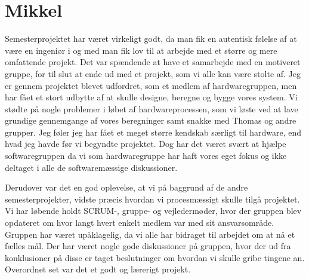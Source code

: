 \section{Mikkel}
Semesterprojektet har været virkeligt godt, da man fik en autentisk følelse af at være en ingeniør i og med man fik lov til at arbejde med et større og mere omfattende projekt. Det var spændende at have et samarbejde med en motiveret gruppe, for til slut at ende ud med et projekt, som vi alle kan være stolte af. Jeg er gennem projektet blevet udfordret, som et medlem af hardwaregruppen, men har fået et stort udbytte af at skulle designe, beregne og bygge vores system. Vi stødte på nogle problemer i løbet af hardwareprocessen, som vi løste ved at lave grundige gennemgange af vores beregninger samt snakke med Thomas og andre grupper. Jeg føler jeg har fået et meget større kendskab særligt til hardware, end hvad jeg havde før vi begyndte projektet.  Dog har det været svært at hjælpe softwaregruppen da vi som hardwaregruppe har haft vores eget fokus og ikke deltaget i alle de softwaremæssige diskussioner.

Derudover var det en god oplevelse, at vi på baggrund af de andre semesterprojekter, vidste præcis hvordan vi procesmæssigt skulle tilgå projektet. Vi har løbende holdt SCRUM-, gruppe- og vejledermøder, hvor der gruppen blev opdateret om hvor langt hvert enkelt medlem var med sit ansvarsområde. Gruppen har været upåklagelig, da vi alle har bidraget til arbejdet om at nå et fælles mål. Der har været nogle gode diskussioner på gruppen, hvor der ud fra konklusioner på disse er taget beslutninger om hvordan vi skulle gribe tingene an. Overordnet set var det et godt og lærerigt projekt.

\clearpage

